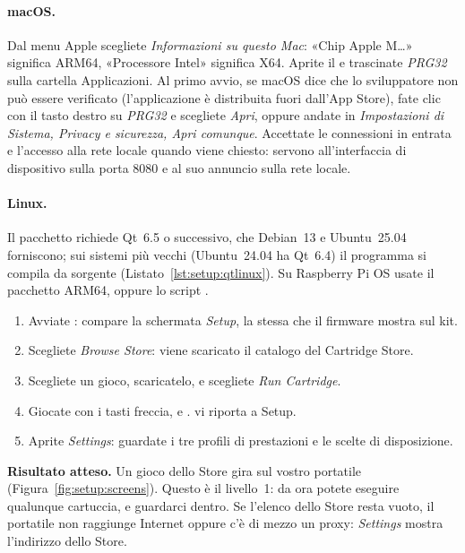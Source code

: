 \paragraph{macOS.} Dal menu Apple scegliete \emph{Informazioni su questo Mac}:
«Chip Apple M\ldots» significa ARM64, «Processore Intel» significa X64. Aprite
il  e trascinate \emph{PRG32} sulla cartella Applicazioni. Al primo
avvio, se macOS dice che lo sviluppatore non può essere verificato
(l'applicazione è distribuita fuori dall'App Store), fate clic con il tasto
destro su \emph{PRG32} e scegliete \emph{Apri}, oppure andate in
\emph{Impostazioni di Sistema, Privacy e sicurezza, Apri comunque}. Accettate
le connessioni in entrata e l'accesso alla rete locale quando viene chiesto:
servono all'interfaccia di dispositivo sulla porta 8080 e al suo annuncio sulla
rete locale.

\paragraph{Linux.} Il pacchetto richiede Qt~6.5 o successivo, che Debian~13 e
Ubuntu~25.04 forniscono; sui sistemi più vecchi (Ubuntu~24.04 ha Qt~6.4) il
programma si compila da sorgente (Listato~\ref{lst:setup:qtlinux}). Su
Raspberry Pi OS usate il pacchetto ARM64, oppure lo script
.


\begin{prgtry}
\begin{enumerate}[nosep]
\item Avviate \prgqt: compare la schermata \emph{Setup}, la stessa che il
  firmware mostra sul kit.
\item Scegliete \emph{Browse Store}: viene scaricato il catalogo del Cartridge
  Store.
\item Scegliete un gioco, scaricatelo, e scegliete \emph{Run Cartridge}.
\item Giocate con i tasti freccia,  e .  vi riporta a
  Setup.
\item Aprite \emph{Settings}: guardate i tre profili di prestazioni e le scelte
  di disposizione.
\end{enumerate}
\textbf{Risultato atteso.} Un gioco dello Store gira sul vostro portatile
(Figura~\ref{fig:setup:screens}). Questo è il livello~1: da ora potete eseguire
qualunque cartuccia, e guardarci dentro. Se l'elenco dello Store resta vuoto,
il portatile non raggiunge Internet oppure c'è di mezzo un proxy:
\emph{Settings} mostra l'indirizzo dello Store.
\end{prgtry}

